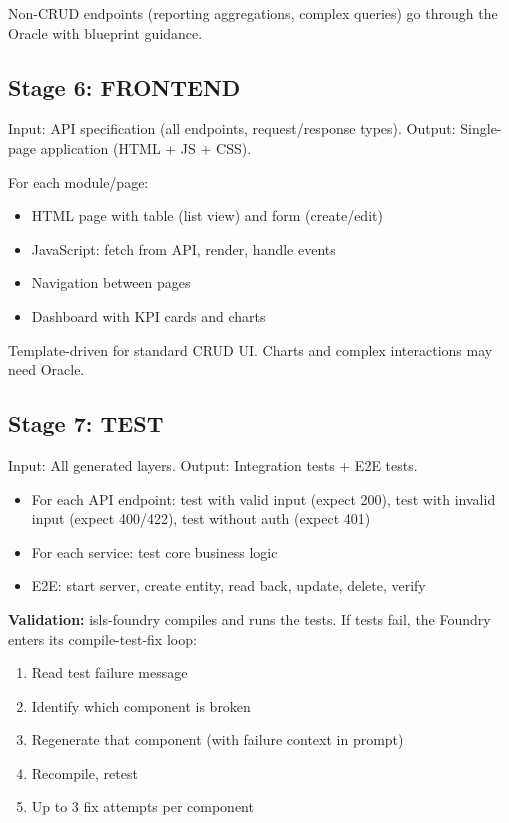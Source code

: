 \documentclass[11pt,a4paper]{article}
\begin{document}
Non-CRUD endpoints (reporting aggregations, complex queries) go
through the Oracle with blueprint guidance.

\subsection{Stage 6: FRONTEND}

Input: API specification (all endpoints, request/response types).
Output: Single-page application (HTML + JS + CSS).

For each module/page:
\begin{itemize}
\item HTML page with table (list view) and form (create/edit)
\item JavaScript: fetch from API, render, handle events
\item Navigation between pages
\item Dashboard with KPI cards and charts
\end{itemize}

Template-driven for standard CRUD UI. Charts and complex
interactions may need Oracle.

\subsection{Stage 7: TEST}

Input: All generated layers.
Output: Integration tests + E2E tests.

\begin{itemize}
\item For each API endpoint: test with valid input (expect 200),
  test with invalid input (expect 400/422), test without auth
  (expect 401)
\item For each service: test core business logic
\item E2E: start server, create entity, read back, update, delete,
  verify
\end{itemize}

\textbf{Validation:} isls-foundry compiles and runs the tests.
If tests fail, the Foundry enters its compile-test-fix loop:
\begin{enumerate}
\item Read test failure message
\item Identify which component is broken
\item Regenerate that component (with failure context in prompt)
\item Recompile, retest
\item Up to 3 fix attempts per component
\end{enumerate}
\end{document}
